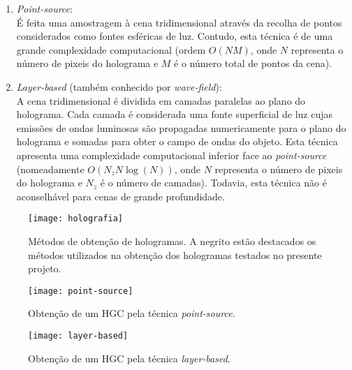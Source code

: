 \begin{enumerate}
  \item \textit{Point-source}\cite{Image2018,Brown1966}:\\
    É feita uma amostragem à cena tridimensional através da recolha de pontos considerados como fontes esféricas de luz. Contudo, esta técnica é de uma grande complexidade computacional (ordem $O(NM)$, onde $N$ representa o número de pixeis do holograma e $M$ é o número total de pontos da cena).

  \item \textit{Layer-based}\cite{Image2018,Lohmann1978} (também conhecido por \textit{wave-field}\cite{Gilles2016}):\\
    A cena tridimensional é dividida em camadas paralelas ao plano do holograma. Cada camada é considerada uma fonte superficial de luz cujas emissões de ondas luminosas são propagadas numericamente para o plano do holograma e somadas para obter o campo de ondas do objeto. Esta técnica apresenta uma complexidade computacional inferior face ao \textit{point-source} (nomeadamente $O(N_z N \log (N))$, onde $N$ representa o número de pixeis do holograma e $N_z$ é o número de camadas). Todavia, esta técnica não é aconselhável para cenas de grande profundidade.
\end{enumerate}

\begin{figure}[!htbp]
  \centering
  \texttt{[image: holografia]}
  \caption[Métodos de obtenção de hologramas.]{Métodos de obtenção de hologramas\cite{Image2018}. A negrito estão destacados os métodos utilizados na obtenção dos hologramas testados no presente projeto.}
  \label{fig:holografia}
\end{figure}

\begin{figure}[!htbp]
  \centering
  \texttt{[image: point-source]}
  \caption[Obtenção de um \acs{HGC} pela técnica \textit{point-source}]{Obtenção de um \acs{HGC} pela técnica \textit{point-source}\cite{Image2018}.}
  \label{fig:point-source}
\end{figure}

\begin{figure}[!htbp]
  \centering
  \texttt{[image: layer-based]}
  \caption[Obtenção de um \acs{HGC} pela técnica \textit{layer-based}]{Obtenção de um \acs{HGC} pela técnica \textit{layer-based}\cite{Image2018}.}
  \label{fig:layer-based}
\end{figure}


